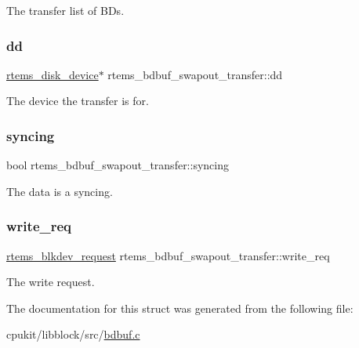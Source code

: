 The transfer list of B\+Ds. \mbox{\label{structrtems__bdbuf__swapout__transfer_acd48a63645769f66f2e62724b18b404f}} 
\subsubsection{\texorpdfstring{dd}{dd}}
{\footnotesize\ttfamily \mbox{\hyperlink{structrtems__disk__device}{rtems\+\_\+disk\+\_\+device}}$\ast$ rtems\+\_\+bdbuf\+\_\+swapout\+\_\+transfer\+::dd}

The device the transfer is for. \mbox{\label{structrtems__bdbuf__swapout__transfer_a57c2629640f84cdbfea289c937d57979}} 
\subsubsection{\texorpdfstring{syncing}{syncing}}
{\footnotesize\ttfamily bool rtems\+\_\+bdbuf\+\_\+swapout\+\_\+transfer\+::syncing}

The data is a sync\textquotesingle{}ing. \mbox{\label{structrtems__bdbuf__swapout__transfer_ae6062478ca23de76a9272537bf25e8fc}} 
\subsubsection{\texorpdfstring{write\_req}{write\_req}}
{\footnotesize\ttfamily \mbox{\hyperlink{structrtems__blkdev__request}{rtems\+\_\+blkdev\+\_\+request}} rtems\+\_\+bdbuf\+\_\+swapout\+\_\+transfer\+::write\+\_\+req}

The write request. 

The documentation for this struct was generated from the following file\+:\begin{DoxyCompactItemize}
\item 
cpukit/libblock/src/\mbox{\hyperlink{bdbuf_8c}{bdbuf.\+c}}\end{DoxyCompactItemize}
